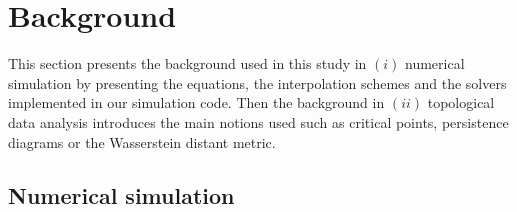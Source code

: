 


\section{Background}
\label{sec_background}
This section presents the background used in this study in $(i)$ numerical simulation by presenting the equations, the interpolation schemes and the solvers implemented in our simulation code. Then the background in $(ii)$ topological data analysis introduces the main notions used such as critical points, persistence diagrams or the Wasserstein distant metric.

\subsection{Numerical simulation}
\label{sec_simulation}
\label{sec_solvers}

